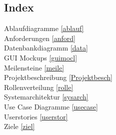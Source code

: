 	
	\subsection{Index}
	Ablaufdiagramme \ref{ablauf}\\
	Anforderungen \ref{anford} \\
	Datenbankdiagramm \ref{data}\\
	GUI Mockups \ref{guimocl}\\
	Meilensteine \ref{meile} \\
	Projektbeschreibung \ref{Projektbesch} \\
	Rollenverteilung \ref{rolle}\\
	Systemarchitektur \ref{sysarch}\\
	Use Case Diagramme \ref{usecase}\\
	Userstories \ref{userstor}\\
	Ziele \ref{ziel}
	

